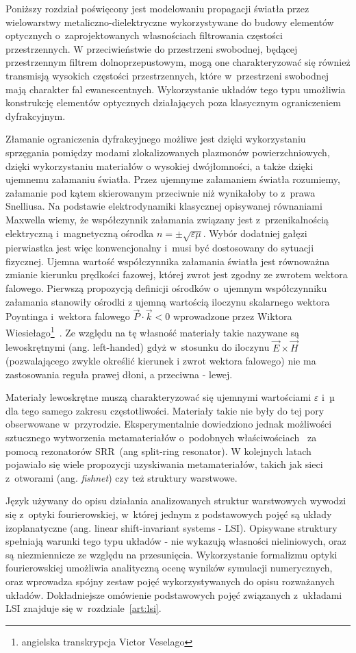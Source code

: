 Poniższy rozdział poświęcony jest modelowaniu propagacji światła przez wielowarstwy metaliczno-dielektryczne wykorzystywane do  budowy elementów optycznych o~zaprojektowanych własnościach filtrowania częstości przestrzennych. W przeciwieństwie do przestrzeni swobodnej, będącej przestrzennym filtrem dolnoprzepustowym, mogą one charakteryzować się również transmisją wysokich częstości przestrzennych, które w~przestrzeni swobodnej mają charakter fal ewanescentnych. Wykorzystanie układów tego typu umożliwia konstrukcję elementów optycznych działających poza klasycznym ograniczeniem dyfrakcyjnym.

Złamanie ograniczenia dyfrakcyjnego możliwe jest dzięki wykorzystaniu sprzęgania pomiędzy modami zlokalizowanych plazmonów powierzchniowych, dzięki wykorzystaniu materiałów o wysokiej dwójłomności, a także dzięki ujemnemu załamaniu światła. Przez ujemnyme załamaniem światła rozumiemy, załamanie pod kątem skierowanym przeciwnie niż wynikałoby to z~prawa Snelliusa. Na podstawie elektrodynamiki klasycznej opisywanej równaniami \nohyphens{Maxwella} wiemy, że współczynnik załamania związany jest z~przenikalnością elektryczną i~magnetyczną ośrodka $n = \pm \sqrt{ \varepsilon \mu}$. Wybór dodatniej gałęzi pierwiastka jest więc konwencjonalny i~musi być dostosowany do sytuacji fizycznej. Ujemna wartość współczynnika załamania światła jest równoważna zmianie kierunku prędkości fazowej, której zwrot jest zgodny ze zwrotem wektora falowego. Pierwszą propozycją definicji ośrodków o~ujemnym współczynniku załamania stanowiły ośrodki z ujemną wartością iloczynu skalarnego wektora Poyntinga i~wektora falowego $\vec{P} \cdot \vec{k} < 0$ wprowadzone przez Wiktora Wiesiełago\footnote{angielska transkrypcja Victor Veselago}~\cite{veselago1968electrodynamics}. Ze względu na tę własność materiały takie nazywane są lewoskrętnymi (ang. left-handed) gdyż w~stosunku do iloczynu $\vec{E} \times \vec{H}$(pozwalającego zwykle określić kierunek i zwrot wektora falowego) nie ma zastosowania reguła prawej dłoni, a przeciwna - lewej.

Materiały lewoskrętne muszą charakteryzować się ujemnymi wartościami $\varepsilon$ i~µ dla tego samego zakresu częstotliwości. Materiały takie nie były do tej pory obserwowane w~przyrodzie. Eksperymentalnie dowiedziono jednak możliwości sztucznego wytworzenia metamateriałów o~podobnych właściwościach~\cite{PhysRevLett.84.4184} za pomocą rezonatorów SRR~(ang split-ring resonator). W kolejnych latach pojawiało się wiele propozycji uzyskiwania metamateriałów, takich jak sieci z~otworami (ang. \textit{fishnet}) czy też struktury warstwowe.

Język używany do opisu działania analizowanych struktur warstwowych wywodzi się z~optyki fourierowskiej, w~której jednym z podstawowych pojęć są układy izoplanatyczne (ang. linear shift-invariant systems - LSI). Opisywane struktury spełniają warunki tego typu układów - nie wykazują własności nieliniowych, oraz są niezmiennicze ze względu na przesunięcia. Wykorzystanie formalizmu optyki fourierowskiej umożliwia analityczną ocenę wyników symulacji numerycznych, oraz wprowadza spójny zestaw pojęć wykorzystywanych do opisu rozważanych układów. Dokładniejsze omówienie podstawowych pojęć związanych z~układami LSI znajduje się w~rozdziale~\ref{art:lsi}.


